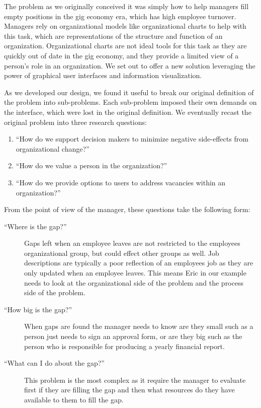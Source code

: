 \documentclass[journal]{vgtc}                %
\begin{document}
The problem as we originally conceived it was simply how to help managers fill empty positions in the gig economy era, which has high employee turnover. Managers rely on organizational models like organizational charts to help with this task, which are representations of the structure and function of an organization. Organizational charts are not ideal tools for this task as they are quickly out of date in the gig economy, and they provide a limited view of a person's role in an organization. We set out to offer a new solution leveraging the power of graphical user interfaces and information visualization. 

As we developed our design, we found it useful to break our original definition of the problem into sub-problems. Each sub-problem imposed their own demands on the interface, which were lost in the original definition. We eventually recast the original problem into three research questions: 

\begin{enumerate}
\item “How do we support decision makers to minimize negative side-effects from organizational change?”
\item “How do we value a person in the organization?”
\item “How do we provide options to users to address vacancies within an organization?”
\end{enumerate}

From the point of view of the manager, these questions take the following form: 

\begin{description}


  	\item [``Where is the gap?''] Gaps left when an employee leaves are not restricted to the employees organizational group, but could effect other groups as well.  Job descriptions are typically a poor reflection of an employees job as they are only updated when an employee leaves.  This means Eric in our example needs to look at the organizational side of the problem and the process side of the problem.
	\item [``How big is the gap?''] When gaps are found the manager needs to know are they small such as a person just needs to sign an approval form, or are they big such as the person who is responsible for producing a yearly financial report.

	\item [``What can I do about the gap?''] This problem is the most complex as it require the manager to evaluate first if they are filling the gap and then what resources do they have available to them to fill the gap.
\end{description}
\end{document}

